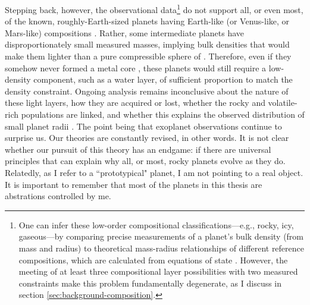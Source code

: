 Stepping back, however, the observational data\footnote{One can infer these low-order compositional classifications---e.g., rocky, icy, gaseous---by comparing precise measurements of a planet's bulk density (from mass and radius) to theoretical mass-radius relationships of different reference compositions, which are calculated from equations of state \citep[in practice, more sophisticated chemical constraints can be leveraged via Markov chain Monte Carlo methods; cf.][]{dorn_bayesian_2017}. However, the meeting of at least three compositional layer possibilities with two measured constraints make this problem fundamentally degenerate, as I discuss in section \ref{sec:background-composition}.} do not support all, or even most, of the known, roughly-Earth-sized planets having Earth-like (or Venus-like, or Mars-like) compositions  \citep{luque_density_2022, rogers_conclusive_2023}. Rather, some intermediate planets have disproportionately small measured masses, implying bulk densities that would make them lighter than a pure compressible sphere of  \citep[e.g.,][section \ref{sec:background-redox}]{dorn_bayesian_2017, dorn_assessing_2018, schulze_probability_2020}. Therefore, even if they somehow never formed a metal core \citep[see][]{elkins-tanton_coreless_2008}, these planets would still require a low-density component, such as a water layer, of sufficient proportion to match the density constraint. %
Ongoing analysis remains inconclusive about the nature of these light layers, how they are acquired or lost, whether the rocky and volatile-rich populations are linked, and whether this explains the observed distribution of small planet radii \citep[and references therein]{neil_evaluating_2022, rogers_conclusive_2023}. The point being that exoplanet observations continue to surprise us. Our theories are constantly revised, in other words. It is not clear whether our pursuit of this theory has an endgame: if there are universal principles that can explain why all, or most, rocky planets evolve as they do. Relatedly, as I refer to a ``prototypical" planet, I am not pointing to a real object. 
It is important to remember that most of the planets in this thesis are abstrations controlled by me.




